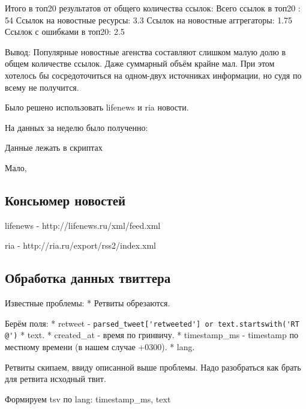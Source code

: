         Итого в топ20 результатов от общего количества ссылок:
        Всего ссылок в топ20 : 54%
        Ссылок на новостные ресурсы: 3.3%
        Ссылок на новостные аггрегаторы: 1.75%
        Ссылок с ошибками в топ20: 2.5%

        Вывод:
        Популярные новостные агенства составляют слишком малую долю в общем количестве ссылок. Даже суммарный объём крайне мал. При этом хотелось бы сосредоточиться на одном-двух источниках информации, но судя по всему не получится.

        Было решено использовать lifenews и ria новости.

        На данных за неделю было полученно:

        Данные лежать в скриптах

        Мало, 


    \subsection{Консьюмер новостей}
        lifenews - http://lifenews.ru/xml/feed.xml

        ria - http://ria.ru/export/rss2/index.xml


    \subsection{Обработка данных твиттера}
        Известные проблемы: 
        * Ретвиты обрезаются.

        Берём поля:
        * retweet - \lstinline{parsed_tweet['retweeted'] or text.startswith('RT @')}
        * text.
        * created\_at - время по гринвичу.
        * timestamp\_ms - timestamp по местному времени (в нашем случае +0300).
        * lang.

        Ретвиты скипаем, ввиду описанной выше проблемы. Надо разобраться как брать для ретвита исходный твит.

        Формируем tsv по lang:
        timestamp\_ms, text

